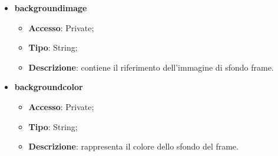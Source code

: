 {{\begin{itemize}
			\item \textbf{backgroundimage}
			\begin{itemize}
				\item \textbf{Accesso}: Private;
				\item \textbf{Tipo}: String;
				\item \textbf{Descrizione}: contiene il riferimento dell’immagine di sfondo frame.
			\end{itemize}
			\item \textbf{backgroundcolor}
			\begin{itemize}
				\item \textbf{Accesso}: Private;
				\item \textbf{Tipo}: String;
				\item \textbf{Descrizione}: rappresenta il colore dello sfondo del frame.
			\end{itemize}
		\end{itemize}
		
}}
